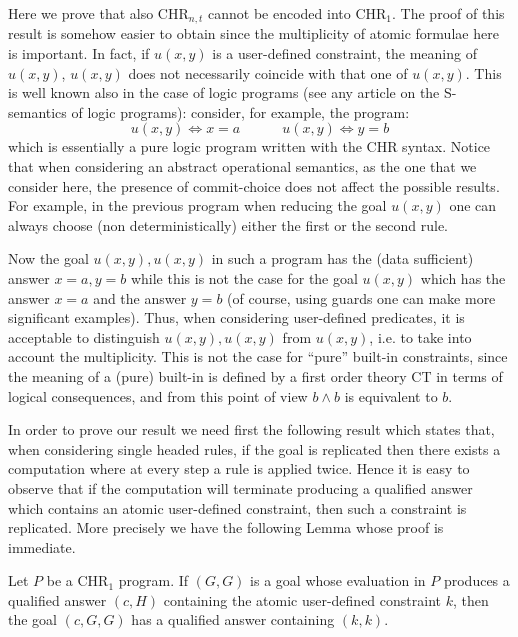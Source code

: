 Here we prove that also CHR$_{n,t}$  cannot be encoded into CHR$_1$.  The proof of this result is somehow easier to obtain since the multiplicity of atomic formulae here is important. In fact,  if $u(x,y)$ is a user-defined constraint,
the meaning of $u(x,y)$, $u(x,y)$ does not necessarily coincide with that one of $u(x,y)$. This is well known also in the case of logic programs (see any article on the S-semantics of logic programs): consider, for example, the  program:
$$  u(x,y) \Leftrightarrow  x = a \quad  \quad  \quad
u(x,y) \Leftrightarrow  y = b$$
which is essentially a pure logic program written with the CHR syntax. Notice that when considering an abstract operational semantics, as the one that we consider here, the presence of commit-choice does not affect the possible results. For example, in the previous program when reducing the goal $u(x,y)$ one can always choose (non deterministically) either the first or the second rule.



Now the goal $u(x,y),u(x,y)$ in such a program has the (data sufficient) answer $x=a, y = b$  while this is not the case for the goal $u(x,y)$ which has the answer  $x=a$ and the answer $y = b$ (of course, using guards one can make more significant examples). Thus, when considering user-defined predicates, it is acceptable to distinguish $u(x,y),u(x,y)$  from $u(x,y)$, i.e. to take into account the multiplicity. This is not the case for  ``pure'' built-in constraints, since the meaning of a (pure) built-in is defined by a first order theory CT in terms of logical consequences,  and from this point of view $b\wedge b$ is equivalent to $b$.

In order to prove our result we need first the following result which states that, when considering single headed rules, if the goal is replicated then there exists a computation where at every step a rule is applied twice. Hence it is easy to observe that if the computation will terminate producing a qualified answer which contains an atomic user-defined constraint, then such a constraint is replicated. More precisely we have the following Lemma whose proof is immediate.

\begin{lemma}\label{lem:single}
 Let $P$ be a CHR$_1$ program. If $(G, G)$ is a goal whose evaluation in $P$ produces a qualified answer $(c, H)$ containing the atomic user-defined constraint $k$, then the goal $(c, G, G)$ has a qualified answer containing $(k,k)$.
\end{lemma}

